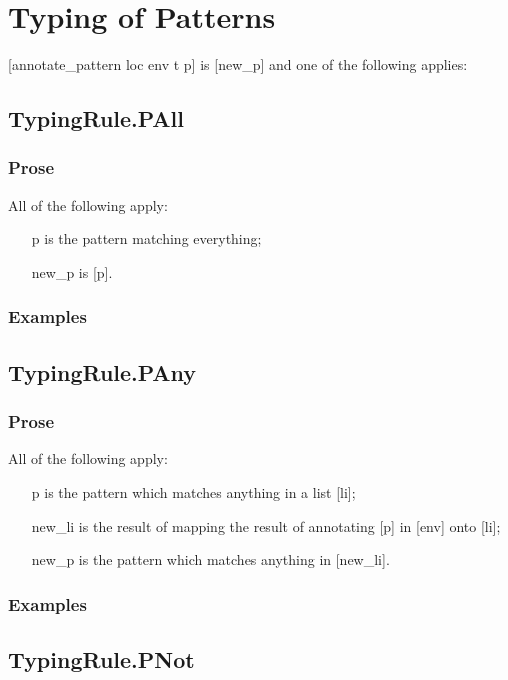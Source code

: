 \documentclass{book}
\begin{document}
\section{Typing of Patterns}
[annotate\_pattern loc env t p] is [new\_p] and one of the following applies:

\subsection{TypingRule.PAll}

    \subsubsection{Prose}
    All of the following apply:
   \begin{itemize}
   \item [p] is the pattern matching everything;
   \item [new\_p] is [p].
   \end{itemize}

    \subsubsection{Examples}

\subsection{TypingRule.PAny}

    \subsubsection{Prose}
    All of the following apply:
   \begin{itemize}
   \item [p] is the pattern which matches anything in a list [li];
   \item [new\_li] is the result of mapping the result of annotating [p] in [env] onto [li];
   \item [new\_p] is the pattern which matches anything in [new\_li].
   \end{itemize}

    \subsubsection{Examples}

\subsection{TypingRule.PNot}
\end{document}
